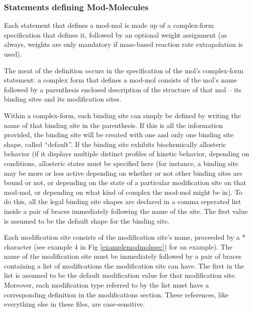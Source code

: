 \subsubsection{Statements defining Mod-Molecules}
Each statement that defines a mod-mol is made up of a complex-form
specification that defines it, followed by an optional weight
assignment (as always, weights are only mandatory if mass-based
reaction rate extrapolation is used).

The meat of the definition occurs in the specification of the mol's
complex-form statement: a complex form that defines a mod-mol consists
of the mol's name followed by a parenthesis enclosed description of the
structure of that mol -- its binding sites and its modification sites.

Within a complex-form, each binding site can simply be defined by
writing the name of that binding site in the parenthesis.  If this is
all the information provided, the binding site will be created with
one and only one binding site shape, called ``default''.  If the
binding site exhibits biochemically allosteric behavior (if it
displays multiple distinct profiles of kinetic behavior, depending on
conditions, allosteric states must be specified here (for instance, a
binding site may be more or less active depending on whether or not
other binding sites are bound or not, or depending on the state of a
particular modification site on that mod-mol, or depending on what
kind of complex the mod-mol might be in).  To do this, all the legal
binding site shapes are declared in a comma seperated list inside a
pair of braces immediately following the name of the site.  The first
value is assumed to be the default shape for the binding site.

Each modification site consists of the modification site's name,
proceeded by a * character (see example 4 in Fig
\ref{examplemodmolssec}) for an example).  The name of the
modification site must be immediately followed by a pair of braces
containing a list of modifications the modification site can have.
The first in the list is assumed to be the default modification value
for that modification site.  Moreover, each modification type referred
to by the list must have a corresponding definition in the
modifications section.  These references, like everything else in
these files, are case-sensitive.

